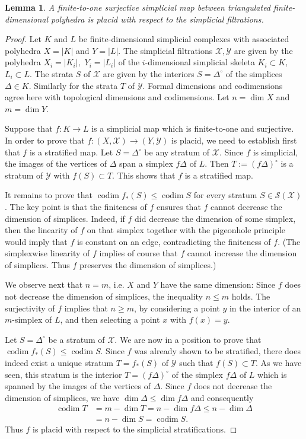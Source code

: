 \documentclass{amsart}
\newtheorem{lemma}[thm]{Lemma}
\theoremstyle{definition}
\theoremstyle{remark}
\newcommand {\Sa}    {\ensuremath{\mbox{$\mathcal{S}$}}}
\newcommand {\Xa}    {\ensuremath{\mathcal{X}}}
\newcommand {\Ya}    {\ensuremath{\mathcal{Y}}}
\newcommand {\codim} {\ensuremath{\operatorname{codim}}}
\begin{document}
\begin{lemma} \label{lem.finsurjsimpmapiscofiltered}
A finite-to-one surjective simplicial map between triangulated 
finite-dimensional polyhedra
is placid with respect to the simplicial filtrations.
\end{lemma}
\begin{proof}
Let $K$ and $L$ be finite-dimensional simplicial complexes
with associated polyhedra $X=|K|$ and $Y=|L|$.
The simplicial filtrations $\Xa, \Ya$ are given by the polyhedra
$X_i = |K_i|,$ $Y_i = |L_i|$ of the $i$-dimensional
simplicial skeleta $K_i \subset K,$ $L_i \subset L$.
The strata $S$ of $\Xa$ are given by the interiors
$S=\Delta^\circ$ of the simplices $\Delta \in K$.
Similarly for the strata $T$ of $\Ya$.
Formal dimensions and codimensions agree here with topological
dimensions and codimensions.
Let $n=\dim X$ and $m=\dim Y$.

Suppose that $f: K \to L$ is a simplicial map which is finite-to-one
and surjective.
In order to prove that $f: (X,\Xa) \to (Y,\Ya)$ is placid, we need
to establish first that $f$ is a stratified map.
Let $S = \Delta^\circ$ be any stratum of $\Xa$.
Since $f$ is simplicial, the images of the vertices of $\Delta$
span a simplex $f\Delta$ of $L$.
Then $T := (f\Delta)^\circ$ is a stratum of 
$\Ya$ with $f(S) \subset T$. This shows that $f$ is a stratified map. 

It remains to prove that $\codim f_* (S) \leq \codim S$ for every
stratum $S\in \Sa (\Xa)$.
The key point is that the finiteness of $f$ ensures that $f$ cannot decrease 
the dimension of simplices.
Indeed, if $f$ did decrease the dimension of some simplex, then
the linearity of $f$ on that simplex together with the pigeonhole principle
would imply that $f$ is constant on an edge, contradicting the 
finiteness of $f$.
(The simplexwise linearity of $f$ implies of course that $f$
cannot increase the dimension of simplices. Thus $f$ preserves
the dimension of simplices.)

We observe next that $n=m$, i.e. $X$ and $Y$ have the same dimension:
Since $f$ does not decrease the dimension of simplices, the
inequality $n\leq m$ holds.
The surjectivity of $f$ implies that $n\geq m$, by considering a point $y$ in 
the interior of an $m$-simplex of $L$, and then selecting a point $x$
with $f(x)=y$.

Let $S = \Delta^\circ$ be a stratum of $\Xa$.
We are now in a position to prove that 
$\codim f_* (S) \leq \codim S$.
Since $f$ was already shown to be stratified, there does indeed exist a
unique stratum $T=f_* (S)$ of $\Ya$ such that $f(S) \subset T$.
As we have seen, this stratum is the interior $T = (f\Delta)^\circ$
of the simplex $f\Delta$ of $L$ which is spanned by the images of the
vertices of $\Delta$.
Since $f$ does not decrease the dimension of simplices, we have
$\dim \Delta \leq \dim f\Delta$
and consequently
\begin{align*}
\codim T 
&= m - \dim T 
 = n - \dim f\Delta \leq n - \dim \Delta \\
&= n - \dim S 
 = \codim S.
\end{align*}
Thus $f$ is placid with respect to the simplicial stratifications.
\end{proof}
\end{document}

